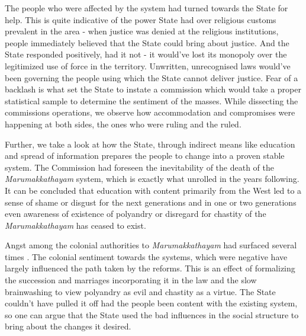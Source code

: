 \documentclass[a4paper]{article}
\begin{document}
The people who were affected by the system had
turned towards the State for help. This is quite
indicative of the power State had over religious
customs prevalent in the area - when justice was
denied at the religious institutions, people
immediately believed that the State could bring
about justice. And the State responded positively,
had it not - it would've lost its monopoly over
the legitimized use of force in the territory.
Unwritten, unrecognised laws would've been
governing the people using which the State cannot
deliver justice. Fear of a backlash is what set
the State to instate a commission which would take
a proper statistical sample to determine the
sentiment of the masses. While dissecting the
commissions operations, we observe how
accommodation and compromises were happening at
both sides, the ones who were ruling and the
ruled.

Further, we take a look at how the State, through
indirect means like education and spread of
information prepares the people to change into a
proven stable system. The Commission had foreseen
the inevitability of the death of the
\emph{Marumakkathayam} system, which is exactly
what unrolled in the years following. It can be
concluded that education with content primarily
from the West led to a sense of shame or disgust
for the next generations and in one or two
generations even awareness of existence of
polyandry or disregard for chastity of the
\emph{Marumakkathayam} has ceased to exist. 

Angst among the colonial authorities to
\emph{Marumakkathayam} had surfaced several times
\cite{menon1894report}. The colonial sentiment
towards the systems, which were negative have
largely influenced the path taken by the reforms.
This is an effect of formalizing the succession
and marriages incorporating it in the law and the
slow brainwashing to view polyandry as evil and
chastity as a virtue.  The State couldn't have
pulled it off had the people been content with the
existing system, so one can argue that the State
used the bad influences in the social structure to
bring about the changes it desired.

\printbibliography 
\end{document}
